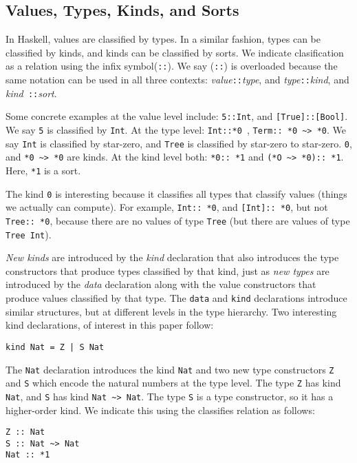 \documentclass{sigplanconf}
\begin{document}
\subsection{Values, Types, Kinds, and Sorts}\label{kinds}

In Haskell, values are classified by types. In a similar fashion, types can be
classified by kinds, and kinds can be classified by sorts. We indicate
clasification as a relation using the infix symbol({\tt ::}). We say ({\tt ::})
is overloaded because the same notation can be used in all three contexts: {\em
value}{\tt ::}{\em type}, and {\em type}{\tt ::}{\em kind}, and {\em kind}{\tt
::}{\em sort}.

Some concrete examples at the value level include:
{\tt 5::Int}, and {\tt [True]::[Bool]}.  We say {\tt 5} is classified by {\tt Int}.
At the type level:
{\tt Int::*0 }, \verb+Term:: *0 ~> *0+. We say {\tt Int}
is classified by star-zero, and {\tt Tree} is classified
by star-zero to star-zero. {\tt *0}, and \verb+*0 ~> *0+ are kinds.
At the kind level both: \verb+*0:: *1+ and \verb+(*O ~> *0):: *1+. Here, \verb+*1+
is a sort.

The kind {\tt *0} is interesting because it classifies all
types that classify values (things we actually can compute). For example,
{\tt Int:: *0}, and {\tt [Int]:: *0}, but not {\tt Tree:: *0}, because
there are no values of type {\tt Tree} (but there are values of type {\tt Tree Int}).

{\em New kinds} are introduced by the {\em kind} declaration that also
introduces the type constructors that produce types classified by that kind,
just as {\em new types} are introduced by the {\em data} declaration along with
the value constructors that produce values classified by that type. The 
{\tt data} and {\tt kind} declarations introduce similar structures, but at
different levels in the type hierarchy. Two interesting kind declarations,
of interest in this paper follow:

\begin{verbatim}
kind Nat = Z | S Nat
\end{verbatim}

The {\tt Nat} declaration introduces the kind {\tt Nat} and two new
type constructors {\tt Z} and {\tt S} which encode the natural
numbers at the type level.
The type {\tt Z} has kind {\tt Nat}, and {\tt S} has kind {\tt Nat \verb+~+>
Nat}. The type {\tt S} is a type constructor, so it has a higher-order kind. We
indicate this using the classifies relation as follows:
\begin{verbatim}
Z :: Nat
S :: Nat ~> Nat
Nat :: *1
\end{verbatim}
\end{document}
